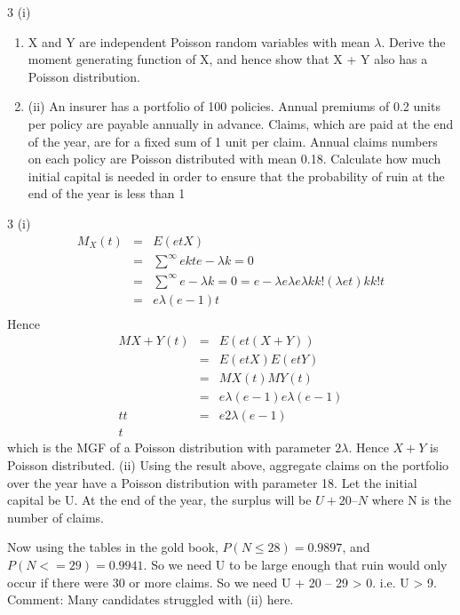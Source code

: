 \documentclass[a4paper,12pt]{article}
\begin{document}
3
(i) 

\begin{enumerate}
\item X and Y are independent Poisson random variables with mean $\lambda$. Derive the moment generating function of X, and hence show that X + Y also has a Poisson distribution.

\item 
(ii) An insurer has a portfolio of 100 policies. Annual premiums of 0.2 units per policy are payable annually in advance. Claims, which are paid at the end of the year, are for a fixed sum of 1 unit per claim. Annual claims numbers on each policy are Poisson distributed with mean 0.18.
\medskip 
Calculate how much initial capital is needed in order to ensure that the probability of ruin at the end of the year is less than 1%
\end{enumerate}
3
(i)
\begin{eqnarray*}
M_{X} ( t ) &=& E ( e tX )\\
&=& \sum^{\infty}e kt e −\lambda
k = 0
\\
&=& \sum^{\infty}e −\lambda
k = 0
= e −\lambda e \lambda e
\lambda k
k !
( \lambda e t ) k
k !
t \\
&=& e \lambda ( e − 1)
t \\
\end{eqnarray*}
Hence
\begin{eqnarray*}
M X + Y ( t ) &=& E ( e t ( X + Y ) )\\
&=& E ( e tX ) E ( e tY )\\
&=& M X ( t ) M Y ( t )\\
&=& e \lambda ( e − 1) e \lambda ( e − 1)\\
t
t
&=& e 2 \lambda ( e − 1)\\
t
\end{eqnarray*}
which is the MGF of a Poisson distribution with parameter $2\lambda$. Hence $X + Y$ is
Poisson distributed.
(ii)
Using the result above, aggregate claims on the portfolio over the year have a Poisson distribution with parameter 18.
Let the initial capital be U. At the end of the year, the surplus will be $U + 20 – N$ where N is the number of claims.

Now using the tables in the gold book, $P(N \leq 28) = 0.9897$, and
$P(N < = 29) = 0.9941$.
So we need U to be large enough that ruin would only occur if there were 30
or more claims. So we need U + 20 – 29 > 0.
i.e. U > 9.
Comment: Many candidates struggled with (ii) here.
\end{document}
